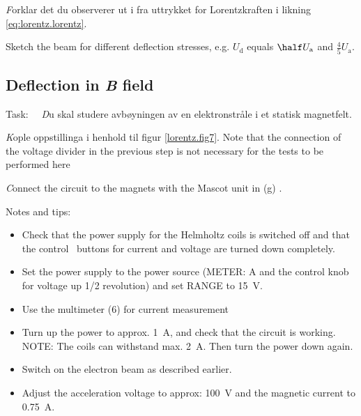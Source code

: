 \documentclass[../Elmag-labhefte-2020.tex]{subfiles}
\begin{document}
{\emph Forklar det du observerer ut i fra uttrykket for Lorentzkraften i likning \eqref{eq:lorentz.lorentz}.

Sketch the beam for different deflection stresses, e.g. $U_\mathrm{d}$ equals $\half  U_\mathrm{a}$ and $\frac{4}{5} U_\mathrm{a}$.
}

 
\subsection{Deflection in \textsl{B} field}

Task: \ \
{\emph Du skal studere avbøyningen av en elektronstråle i et statisk magnetfelt.}


{\emph Kople oppstillinga i henhold til figur \ref{lorentz.fig7}. Note that the connection of the voltage divider in the previous step is not necessary for the tests to be performed here}

{\emph Connect the circuit to the magnets with the Mascot unit in (g)
.}


Notes and tips:
\vspace{-4mm}
\begin{itemize}
    \item Check that the power supply for the Helmholtz coils is switched off and that the control \ buttons for current and voltage are turned down completely.
    \item Set the power supply to the power source (METER: A and the control knob for voltage up 1/2 revolution) and set RANGE to \SI{15}{\volt}.
    \item Use the multimeter (6) for current measurement
    \item Turn up the power to approx. \SI{1}{\ampere}, and check that the circuit is working. NOTE: The coils can withstand max. \SI{2}{\ampere}. Then turn the power down again.
    \item Switch on the electron beam as described earlier.
    \item Adjust the acceleration voltage to approx: \SI{100}{\volt} and the magnetic current to \SI{0,75}{\ampere}.
\end{itemize}
\end{document}
